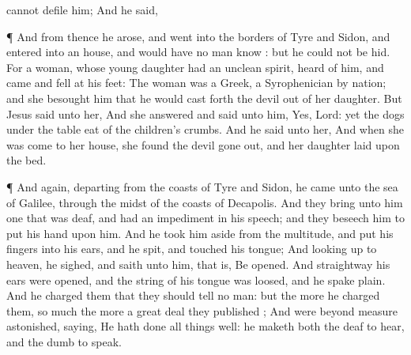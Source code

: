 {{{cannot
defile
him;}}
And he
said,
{}
\par }{\PP {}¶
And from
thence he
arose, and
went
into the
borders of
Tyre
and
Sidon,
and
entered
into an
house, and would
have no
man
know
{}:
but he
could
not be
hid.
For
a
{}
woman,
whose young
daughter
had
an
unclean
spirit,
heard
of
him, and
came and
fell
at
his
feet:
The
woman
was a
Greek, a
Syrophenician by
nation;
and she
besought
him
that he would cast
forth the
devil
out
of
her
daughter.
But
Jesus
said unto
her,
{}
And she
answered
and
said unto
him,
Yes,
Lord:
yet the
dogs
under the
table
eat
of the
children’s
crumbs.
And he
said unto
her,
{}
And when she was
come
to
her
house, she
found the
devil gone
out,
and her
daughter
laid
upon the
bed.
\par }{\PP {}¶
And
again,
departing
from the
coasts of
Tyre
and
Sidon, he
came
unto the
sea of
Galilee,
through the
midst of the
coasts of
Decapolis.
And they
bring unto
him one that was
deaf, and had an impediment in his
speech;
and they
beseech
him
to
put his
hand
upon
him.
And he
took
him
aside
from the
multitude, and
put
his
fingers
into
his
ears,
and he
spit, and
touched
his
tongue;
And looking
up
to
heaven, he
sighed,
and
saith unto
him,
{}
that
is, Be
opened.
And
straightway
his
ears were
opened,
and the
string
of
his
tongue was
loosed,
and he
spake
plain.
And he
charged
them
that they should
tell no
man:
but the
more
he
charged
them, so much the
more a great
deal they
published
{};
And
were beyond
measure
astonished,
saying, He hath
done all
things
well: he
maketh
both the
deaf to
hear,
and the
dumb to
speak.

}
